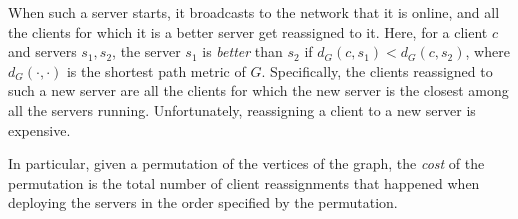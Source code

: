 \documentclass{article}
\begin{document}
When such a server starts, it broadcasts to the network that it is online, and all the clients for which it is a better server get reassigned to it. Here, for a client \(c\) and servers \(s_1, s_2\), the server \(s_1\) is \emph{better} than \(s_2\) if \(d_G (c, s_1) < d_G (c, s_2)\), where \(d_G(\cdot, \cdot)\) is the shortest path metric of \(G\). Specifically, the clients reassigned to such a new server are all the clients for which the new server is the closest among all the servers running. Unfortunately, reassigning a client to a new server is expensive.

In particular, given a permutation of the vertices of the graph, the \emph{cost} of the permutation is the total number of client reassignments that happened when deploying the servers in the order specified by the permutation.
\end{document}
